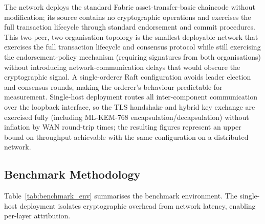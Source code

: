 \documentclass{ieeetj}
\begin{document}
The network deploys the standard Fabric asset-transfer-basic chaincode without
modification; its source contains no cryptographic operations and exercises the
full transaction lifecycle through standard endorsement and commit procedures.
This two-peer, two-organisation topology is the smallest deployable network that
exercises the full transaction lifecycle and consensus protocol while still
exercising the endorsement-policy mechanism (requiring signatures from both
organisations) without introducing network-communication delays that would
obscure the cryptographic signal. A single-orderer Raft configuration avoids
leader election and consensus rounds, making the orderer's behaviour predictable
for measurement. Single-host deployment routes all inter-component communication
over the loopback interface, so the TLS handshake and hybrid key exchange are
exercised fully (including ML-KEM-768 encapsulation/decapsulation) without
inflation by WAN round-trip times; the resulting figures represent an upper
bound on throughput achievable with the same configuration on a distributed
network.

\subsection{Benchmark Methodology}
\label{sec:exp_benchmethod}

Table~\ref{tab:benchmark_env} summarises the benchmark environment. The
single-host deployment isolates cryptographic overhead from network latency,
enabling per-layer attribution.
\end{document}
